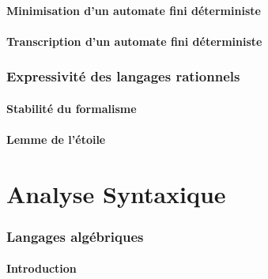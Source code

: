\documentclass[9pt]{beamer}
\begin{document}
\subsection{Minimisation d'un automate fini déterministe}








 
\subsection{Transcription d'un automate fini déterministe}



 
\section{Expressivité des langages rationnels}
 
\subsection{Stabilité du formalisme}



 
\subsection{Lemme de l'étoile}



 
 
\part{Analyse Syntaxique}
 
 
\section{Langages algébriques}
 
\subsection{Introduction}



 
\end{document}

